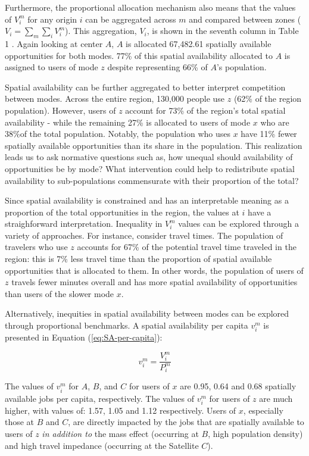 \documentclass[10pt,letterpaper]{article}
\begin{document}
Furthermore, the proportional allocation mechanism also means that the
values of \(V_i^m\) for any origin \(i\) can be aggregated across \(m\)
and compared between zones (\(V_i = \sum_m{\sum_i{V_i^m}}\)). This
aggregation, \(V_i\), is shown in the seventh column in Table 1 . Again
looking at center \(A\), \(A\) is allocated 67,482.61 spatially
available opportunities for both modes. 77\% of this spatial
availability allocated to \(A\) is assigned to users of mode \(z\)
despite representing 66\% of \(A\)'s population.

Spatial availability can be further aggregated to better interpret
competition between modes. Across the entire region, 130,000 people use
\(z\) (62\% of the region population). However, users of \(z\) account
for 73\% of the region's total spatial availability - while the
remaining 27\% is allocated to users of mode \(x\) who are 38\%of the
total population. Notably, the population who uses \(x\) have 11\% fewer
spatially available opportunities than its share in the population. This
realization leads us to ask normative questions such as, how unequal
should availability of opportunities be by mode? What intervention could
help to redistribute spatial availability to sub-populations
commensurate with their proportion of the total?

Since spatial availability is constrained and has an interpretable
meaning as a proportion of the total opportunities in the region, the
values at \(i\) have a straighforward interpretation. Inequality in
\(V_i^m\) values can be explored through a variety of approaches. For
instance, consider travel times. The population of travelers who use
\(z\) accounts for 67\% of the potential travel time traveled in the
region: this is 7\% less travel time than the proportion of spatial
available opportunities that is allocated to them. In other words, the
population of users of \(z\) travels fewer minutes overall and has more
spatial availability of opportunities than users of the slower mode
\(x\).

Alternatively, inequities in spatial availability between modes can be
explored through proportional benchmarks. A spatial availability per
capita \(v_i^m\) is presented in Equation (\ref{eq:SA-per-capita}):

\begin{equation}
\label{eq:SA-per-capita}
v_{i}^m = \frac{V_{i}^m}{P_{i}^m}
\end{equation}

The values of \(v_i^m\) for \(A\), \(B\), and \(C\) for users of \(x\)
are 0.95, 0.64 and 0.68 spatially available jobs per capita,
respectively. The values of \(v_i^m\) for users of \(z\) are much
higher, with values of: 1.57, 1.05 and 1.12 respectively. Users of
\(x\), especially those at \(B\) and \(C\), are directly impacted by the
jobs that are spatially available to users of \(z\) \emph{in addition
to} the mass effect (occurring at \(B\), high population density) and
high travel impedance (occurring at the Satellite \(C\)).
\end{document}
